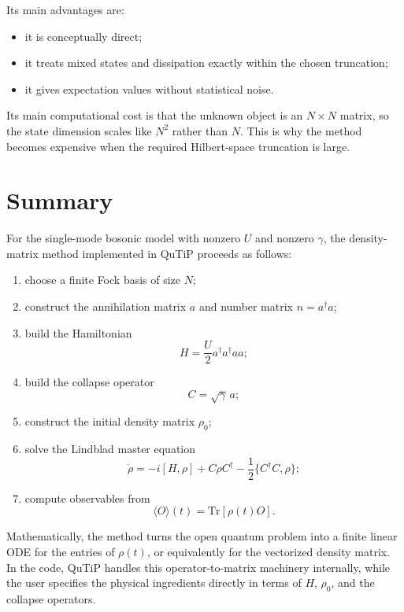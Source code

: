 \documentclass[12pt]{article}
\begin{document}
Its main advantages are:
\begin{itemize}
\item it is conceptually direct;
\item it treats mixed states and dissipation exactly within the chosen truncation;
\item it gives expectation values without statistical noise.
\end{itemize}

Its main computational cost is that the unknown object is an $N\times N$ matrix, so the state dimension scales like $N^2$ rather than $N$. This is why the method becomes expensive when the required Hilbert-space truncation is large.

\section*{Summary}
For the single-mode bosonic model with nonzero $U$ and nonzero $\gamma$, the density-matrix method implemented in QuTiP proceeds as follows:
\begin{enumerate}
\item choose a finite Fock basis of size $N$;
\item construct the annihilation matrix $a$ and number matrix $n=a^\dagger a$;
\item build the Hamiltonian
\[
H=\frac{U}{2}a^\dagger a^\dagger a a;
\]
\item build the collapse operator
\[
C=\sqrt{\gamma}\,a;
\]
\item construct the initial density matrix $\rho_0$;
\item solve the Lindblad master equation
\[
\dot{\rho}=-i[H,\rho]+C\rho C^\dagger-\frac12\{C^\dagger C,\rho\};
\]
\item compute observables from
\[
\langle O\rangle(t)=\mathrm{Tr}[\rho(t)O].
\]
\end{enumerate}

Mathematically, the method turns the open quantum problem into a finite linear ODE for the entries of $\rho(t)$, or equivalently for the vectorized density matrix. In the code, QuTiP handles this operator-to-matrix machinery internally, while the user specifies the physical ingredients directly in terms of $H$, $\rho_0$, and the collapse operators.
\end{document}
